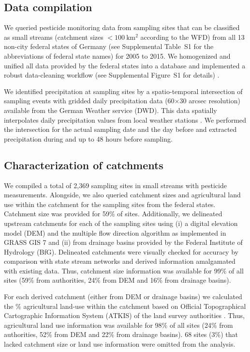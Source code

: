 \documentclass[journal=esthag,manuscript=article]{achemso}
\begin{document}
\subsection{Data compilation}
We queried pesticide monitoring data from sampling sites that can be classified as small streams (catchment sizes $\mathrm{< 100~km^2}$ according to the WFD) from all 13 non-city federal states of Germany (see Supplemental Table~S1 for the abbreviations of federal state names) for 2005 to 2015.
We homogenized and unified all data provided by the federal states into a database and implemented a robust data-cleaning workflow (see Supplemental Figure~S1 for details) \citep{poisot_best_2015}.

We identified precipitation at sampling sites by a spatio-temporal intersection of sampling events with gridded daily precipitation data (60$\times$30 arcsec resolution) available from the German Weather service (DWD).
This data spatially interpolates daily precipitation values from local weather stations \citep{rauthe_central_2013}. 
We performed the intersection for the actual sampling date and the day before and extracted precipitation during and up to 48 hours before sampling. 


\subsection{Characterization of catchments}
We compiled a total of 2,369 sampling sites in small streams with pesticide measurements. %
Alongside, we also queried catchment sizes and agricultural land use within the catchment for the sampling sites from the federal states. %
Catchment size was provided for 59\% of sites. 
Additionally, we delineated upstream catchments for each of the sampling sites using (i) a digital elevation model (DEM) \citep{eea_digital_2013} and the multiple flow direction algorithm \citep{holmgren_multiple_1994} as implemented in GRASS GIS 7 \citep{neteler_grass_2012} and (ii) from drainage basins provided by the Federal Institute of Hydrology (BfG). 
Delineated catchments were visually checked for accuracy by comparison with state stream networks and derived information amalgamated with existing data.
Thus, catchment size information was available for 99\% of all sites (59\% from authorities, 24\% from DEM and 16\% from drainage basins). 

For each derived catchment (either from DEM or drainage basins) we calculated the \% agricultural land-use within the catchment based on Official Topographical Cartographic Information System (ATKIS) of the land survey authorities \citep{adv_atkis_2016}. 
Thus, agricultural land use information was available for 98\% of all sites (24\% from authorities, 52\% from DEM and 22\% from drainage basins). 
68 sites (3\%) that lacked catchment size or land use information were omitted from the analysis. 
\end{document}
